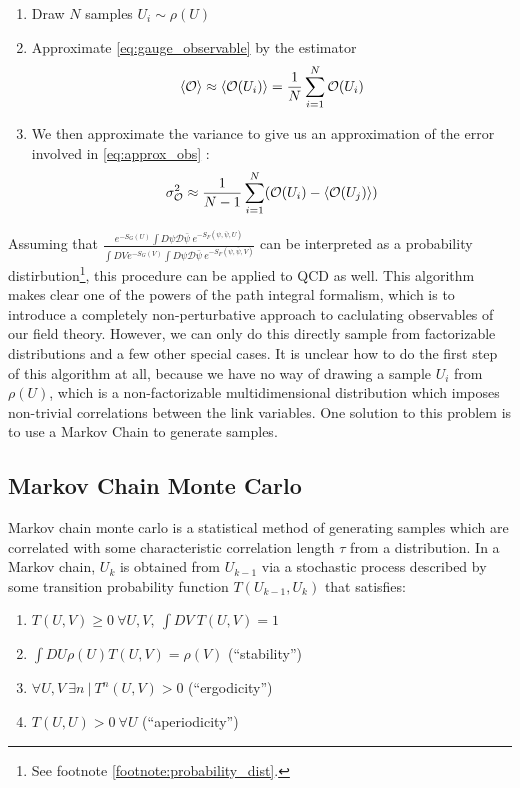 \documentclass[11pt]{article}
\begin{document}
\begin{enumerate}
\item Draw $N$ samples $U_i\sim\rho(U)$
\item Approximate \eqref{eq:gauge_observable} by the estimator
\begin{equation}\label{eq:approx_obs}\braket{\mathcal O}\approx\braket{\mathcal O(U_i)}=\frac{1}{N}\sum_{i=1}^N \mathcal O(U_i)\end{equation}
\item We then approximate the variance to give us an approximation of the error involved in \eqref{eq:approx_obs} :
\begin{equation}\sigma_\mathcal O^2\approx \frac{1}{N-1}\sum_{i=1}^N(\mathcal O(U_i)-\braket{\mathcal O(U_j)})\end{equation}
\end{enumerate}

Assuming that $\frac{e^{-S_G(U)}\int D\psi\mathcal D\bar\psi\ e^{-S_F(\psi,\bar\psi,U)}}{\int DV e^{-S_G(V)}\int D\psi\mathcal D\bar\psi\ e^{-S_F(\psi,\bar\psi,V)}}$ can be interpreted as a probability distirbution\footnote{See footnote \ref{footnote:probability_dist}.}, this procedure can be applied to QCD as well. This algorithm makes clear one of the powers of the path integral formalism, which is to introduce a completely non-perturbative approach to caclulating observables of our field theory. However, we can only do this directly sample from factorizable distributions and a few other special cases. It is unclear how to do the first step of this algorithm at all, because we have no way of drawing a sample $U_i$ from $\rho(U)$, which is a non-factorizable multidimensional distribution which  imposes non-trivial correlations between the link variables. One solution to this problem is to use a Markov Chain to generate samples.

\subsection{Markov Chain Monte Carlo}

\label{sec:markov}

Markov chain monte carlo is a statistical method of generating samples which are correlated with some characteristic correlation length $\tau$ from a distribution. In a Markov chain, $U_k$ is obtained from $U_{k-1}$ via a stochastic process described by some transition probability function $T(U_{k-1},U_k)$ that satisfies:

\begin{enumerate}
\item $T(U,V)\geq 0\ \forall U,V,\ \int DV\ T(U,V)=1$
\item $\int DU \rho(U) T(U,V)=\rho(V)$ (``stability'')
\item $\forall U,V\ \exists n\ |\ T^n(U,V)>0$ (``ergodicity'')
\item $T(U,U)>0\ \forall U$ (``aperiodicity'')
\end{enumerate}
\end{document}
